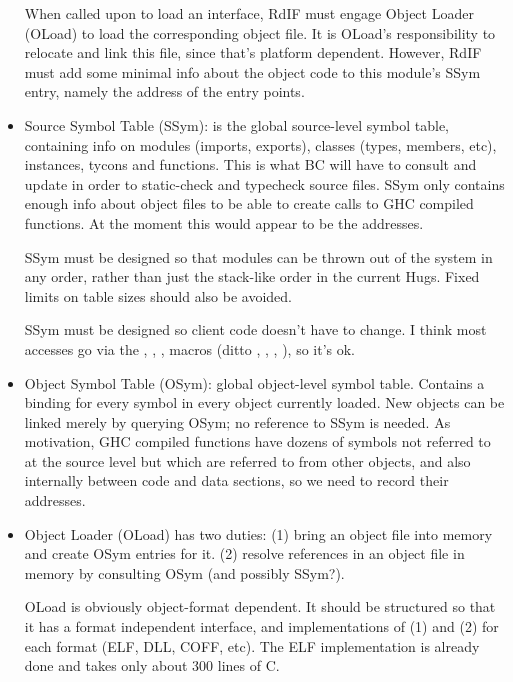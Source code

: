 \begin{itemize}
  When called upon to load an interface, RdIF must engage Object
  Loader (OLoad) to load the corresponding object file.  It is OLoad's
  responsibility to relocate and link this file, since that's platform
  dependent.  However, RdIF must add some minimal info about the
  object code to this module's SSym entry, namely the address of the
   entry points.

\item
  Source Symbol Table (SSym): is the global source-level symbol
  table, containing info on modules (imports, exports), classes
  (types, members, etc), instances, tycons and functions.  This is
  what BC will have to consult and update in order to static-check and
  typecheck source files.  SSym only contains enough info about object
  files to be able to create calls to GHC compiled functions.  At the
  moment this would appear to be the  addresses.

  SSym must be designed so that modules can be thrown out of the
  system in any order, rather than just the stack-like order in the
  current Hugs.  Fixed limits on table sizes should also be avoided.

  SSym must be designed so client code doesn't have to change.
  I think most accesses go via the , ,
  ,  macros (ditto ,
  , , ), so it's ok.

\item
  Object Symbol Table (OSym): global object-level symbol table.
  Contains a binding for every symbol in every object currently
  loaded.  New objects can be linked merely by querying OSym;
  no reference to SSym is needed.  As motivation, GHC compiled 
  functions have dozens of symbols not referred to at the source
  level but which are referred to from other objects, and also 
  internally between code and data sections, so we need
  to record their addresses.


\item
  Object Loader (OLoad) has two duties: (1) bring an object file into
  memory and create OSym entries for it.  (2) resolve references in an
  object file in memory by consulting OSym (and possibly SSym?).

  OLoad is obviously object-format dependent.  It should be structured
  so that it has a 
  format independent interface, and implementations of (1) and (2) for
  each format (ELF, DLL, COFF, etc).  The ELF implementation is
  already done and takes only about 300 lines of C.


\end{itemize}
